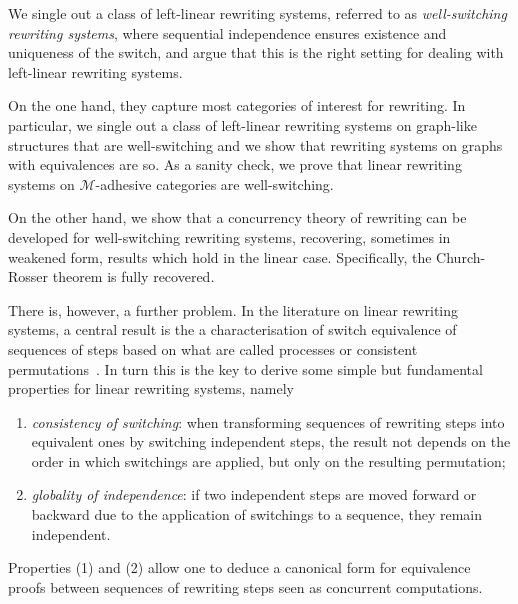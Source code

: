 \documentclass[a4paper,UKenglish,cleveref,pdftex,thm-restate,numberwithinsect,anonymous]{lipics}
\begin{document}
We single out a class of left-linear rewriting
systems, referred to as \emph{well-switching rewriting systems}, where sequential independence ensures existence and uniqueness of the
switch, and argue that this is the right setting for dealing with
left-linear rewriting systems.


On the one hand, they capture most categories of
interest for rewriting. In particular, we single out a class of
left-linear rewriting systems on graph-like structures that are
well-switching and we show that rewriting systems on graphs with
equivalences are so. 
As a sanity check, we prove that linear rewriting systems on
$\mathcal{M}$-adhesive categories are well-switching.

On the other hand, we show that a concurrency theory of rewriting can
be developed for well-switching rewriting systems, recovering, sometimes in
weakened form, results which hold in the linear case.  Specifically, 
the Church-Rosser theorem is fully recovered.



  


There is, however, a further problem. In the literature on linear
rewriting systems, a central result is the a characterisation of
switch equivalence of sequences of steps based on what are called processes or
consistent permutations~\cite{Handbook, tobias}.
In turn this is the key
to derive some simple but fundamental properties for linear rewriting
systems, namely

\begin{enumerate}
\item \emph{consistency of switching}: when transforming
  sequences of rewriting steps into equivalent ones by switching independent steps, the
  result not depends on the order in which switchings are applied, but
  only on the resulting permutation;
\item \emph{globality of independence}: if two independent steps are
  moved forward or backward due to the application of switchings to a
  sequence, they remain independent.
\end{enumerate}
Properties (1) and (2) allow one to deduce a canonical form for equivalence proofs 
between sequences of rewriting steps seen as concurrent computations.
\end{document}
